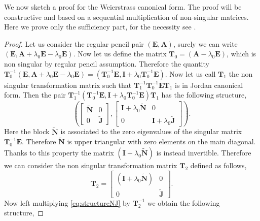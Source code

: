 		We now sketch a proof for the Weierstrass canonical form.
		The proof will be constructive and based on a sequential
		multiplication of non-singular matrices.
		Here we prove only the sufficiency part, for the necessity see \cite{gantmacher1964theory}.
		\begin{proof}
			Let us consider the regular pencil pair $(\bm{E},\bm{A})$,
			surely we can write $(\bm{E},\bm{A}+\lambda_{0}\bm{E}-\lambda_{0}\bm{E})$.
			Now let us define the matrix $\bm{T}_{0}=(\bm{A}-\lambda_{0}\bm{E})$,
			which is non singular by regular pencil assumption.
			Therefore the quantity 
			$\bm{T}_{0}^{-1}(\bm{E},\bm{A}+\lambda_{0}\bm{E}-\lambda_{0}\bm{E}) 
			 = \left(\bm{T}_{0}^{-1}\bm{E},\bm{I}+\lambda_{0}\bm{T}_{0}^{-1}\bm{E}\right)$.
			Now let us call $\bm{T}_{1}$ the non singular transformation matrix 
			such that $\bm{T}_{1}^{-1}\bm{T}_{0}^{-1}\bm{ET}_{1}$ is in
			Jordan canonical form.
			Then the pair 
			$\bm{T}_{1}^{-1}\left(\bm{T}_{0}^{-1}\bm{E},\bm{I}+\lambda_{0}\bm{T}_{0}^{-1}\bm{E}\right)\bm{T}_{1}$
			has the following structure,
			\begin{equation}
				\label{eq:structureNJ}
				\left(
				\begin{bmatrix}
					\tilde{\bm{N}} & 0 \\
					0 			   & \tilde{\bm{J}}
				\end{bmatrix},
				\begin{bmatrix}
					\bm{I} + \lambda_{0}\tilde{\bm{N}} 	& 0 \\
					0 							        & \bm{I} + \lambda_{0}\tilde{\bm{J}}
				\end{bmatrix}
				\right).
			\end{equation}
			Here the block $\tilde{\bm{N}}$ is associated to the zero eigenvalues
			of the singular matrix $\bm{T}_{0}^{-1}\bm{E}$.
			Therefore $\tilde{\bm{N}}$ is upper triangular with zero elements on the main diagonal.
			Thanks to this property the matrix $(\bm{I}+\lambda_{0}\tilde{\bm{N}})$ is instead invertible.
			Therefore we can consider the non singular transformation matrix $\bm{T}_{2}$ defined as follows,
			\begin{equation}
				\bm{T}_{2} = 
				\begin{bmatrix}
					(\bm{I}+\lambda_{0}\tilde{\bm{N}}) & 0 \\
					0 & \tilde{\bm{J}}
				\end{bmatrix}.
			\end{equation}
			Now left multiplying \cref{eq:structureNJ} by $\bm{T}_{2}^{-1}$ we obtain the following structure,

\end{proof}
